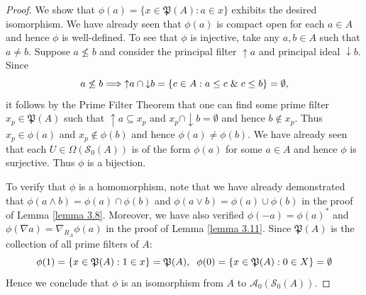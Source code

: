 \documentclass{amsart}
\theoremstyle{plain}
\theoremstyle{definition}
\begin{document}
\begin{proof}
    We show that $\phi(a)=\{x\in\mathfrak{P}(A):a\in x\}$ exhibits the desired isomorphism. We have already seen that $\phi(a)$ is compact open for each $a\in A$ and hence $\phi$ is well-defined. To see that $\phi$ is injective, take any $a,b\in A$ such that $a\not=b$. Suppose $a\not\leq b$ and consider the principal filter ${\uparrow}a$ and principal ideal ${\downarrow}b$. Since \[a\not\leq b\Longrightarrow{\uparrow}a\cap{\downarrow}b=\{c\in A:a\leq c\hspace{.1cm}\&\hspace{.1cm} c\leq b\}=\emptyset,\] it follows by the Prime Filter Theorem that one can find some prime filter $x_p\in\mathfrak{P}(A)$ such that ${\uparrow}a\subseteq x_p$ and $x_p\cap{\downarrow}b=\emptyset$ and hence $b\not\in x_p$. Thus $x_p\in\phi(a)$ and $x_p\not\in\phi(b)$ and hence $\phi(a)\not=\phi(b)$. We have already seen that each $U\in\Omega(\mathcal{S}_0(A))$ is of the form $\phi(a)$ for some $a\in A$ and hence $\phi$ is surjective. Thus $\phi$ is a bijection.  

    To verify that $\phi$ is a homomorphism, note that we have already demonstrated that $\phi(a\wedge b)=\phi(a)\cap\phi(b)$ and $\phi(a\vee b)=\phi(a)\cup\phi(b)$ in the proof of Lemma \ref{lemma 3.8}. Moreover, we have also verified $\phi(-a)=\phi(a)^*$ and $\phi(\nabla a)=\nabla_{R_A}\phi(a)$ in the proof of Lemma \ref{lemma 3.11}. Since $\mathfrak{P}(A)$ is the collection of all prime filters of $A$:   
\[\phi(1)=\{x\in\mathfrak{P}(A):1\in x\}=\mathfrak{P}(A),\hspace{.2cm}\phi(0)=\{x\in\mathfrak{P}(A):0\in X\}=\emptyset\] Hence we conclude that $\phi$ is an isomorphism from $A$ to $\mathcal{A}_0(\mathcal{S}_0(A))$. 
\end{proof}
\end{document}
